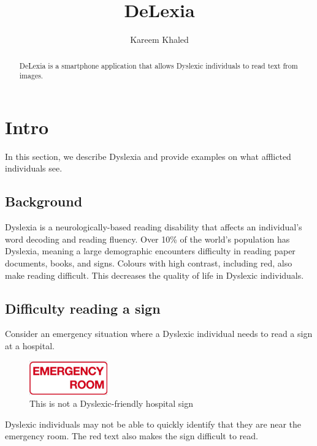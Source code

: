\documentclass[a4paper]{article}
\title{DeLexia}
\author{Kareem Khaled}
\begin{document}
\maketitle

\begin{abstract}
DeLexia is a smartphone application that allows Dyslexic individuals to read text from images. 
\end{abstract}




\section{Intro}

In this section, we describe Dyslexia and provide examples on what afflicted individuals see.

\subsection{Background}

Dyslexia is a neurologically-based reading disability that affects an individual's word decoding and reading fluency. 
Over 10\% of the world's population has Dyslexia, meaning a large demographic encounters difficulty in reading paper documents, books, and signs. Colours with high contrast, including red, also make reading difficult. 
This decreases the quality of life in Dyslexic individuals.

\subsection{Difficulty reading a sign}

Consider an emergency situation where a Dyslexic individual needs to read a sign at a hospital. 

\begin{figure}[!htb]
\centering
\includegraphics[width=0.3\textwidth]{EmergencySign_1_.jpg}
\caption{\label{fig:bad}This is not a Dyslexic-friendly hospital sign}
\end{figure}



Dyslexic individuals may not be able to quickly identify that they are near the emergency room. The red text also makes the sign difficult to read. 
\end{document}
